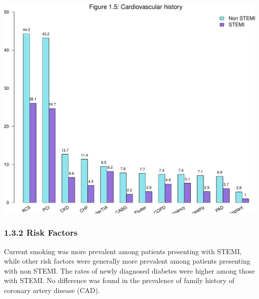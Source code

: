\documentclass[
]{article}
\begin{document}
\includegraphics{ACSIS_2024_v1_pdf_files/figure-latex/unnamed-chunk-19-1.pdf}

\pagebreak

\subsubsection{1.3.2 Risk Factors}\label{risk-factors}

Current smoking was more prevalent among patients presenting with STEMI,
while other risk factors were generally more prevalent among patients
presenting with non STEMI. The rates of newly diagnosed diabetes were
higher among those with STEMI. No difference was found in the prevalence
of family history of coronary artery disease (CAD).

~
\end{document}
